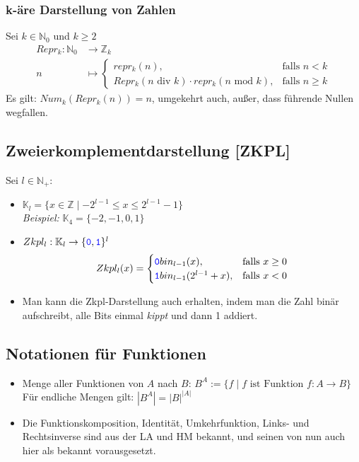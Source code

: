 \documentclass{article}
\newcommand{\N}{\mathbb{N_+}} %
\newcommand{\Nz}{{\mathbb{N}_0}} %
\newcommand{\Z}{\mathbb{Z}} %
\newcommand{\blue}[1]{\textcolor{blue}{#1}}
\newcommand{\important}[1]{\textcolor{importantColor}{#1}}
\newcommand{\example}[1]{\textit{Beispiel: }#1}
\newcommand{\word}[1]{\blue{\texttt{#1}}}
\newcommand{\set}[1]{\{#1\}}
\begin{document}
\subsubsection{k-äre Darstellung von Zahlen}
Sei $k\in\Nz$ und $k\geq2$
\begin{align*}
    Repr_k:\Nz&\to\Z_k\\
    n&\mapsto 
    \begin{cases}
        repr_k(n), &\text{falls } n<k\\
        Repr_k(n\text{ div }k)\cdot repr_k(n\text{ mod }k), &\text{falls }n\geq k
    \end{cases}
\end{align*}
Es gilt: $Num_k(Repr_k(n))=n$, umgekehrt auch, außer, dass führende Nullen wegfallen.

\subsection{Zweierkomplementdarstellung [ZKPL]}
Sei $l\in\N$:
\begin{itemize}
    \item $\mathbb{K}_l = \set{x\in\Z\mid -2^{l-1}\leq x\leq 2^{l-1}-1}$\\
    \example{$\mathbb{K}_4=\set{-2,-1,0,1}$}
    \item $Zkpl_l: \mathbb{K}_l\to\set{\word{0}, \word{1}}^l$
    \[
        Zkpl_l(x)=
        \begin{cases}
            \word{0}bin_{l-1}(x), &\text{falls }x\geq 0\\
            \word{1}bin_{l-1}(2^{l-1}+x), &\text{falls }x<0
        \end{cases}
    \]
    \item Man kann die Zkpl-Darstellung auch erhalten, indem man die Zahl binär aufschreibt, alle Bits einmal \textit{kippt} und dann 1 addiert.
\end{itemize}

\subsection{Notationen für Funktionen}
\begin{itemize}
    \item Menge aller Funktionen von $A$ nach $B$: \important{$B^A:=\set{f\mid f \text{ ist Funktion } f:A\to B}$}\\
    Für endliche Mengen gilt: $|B^A|=|B|^{|A|}$
    \item Die Funktionskomposition, Identität, Umkehrfunktion, Links- und Rechtsinverse sind aus der LA und HM bekannt, und seinen von nun auch hier als bekannt vorausgesetzt.
\end{itemize}
\end{document}
